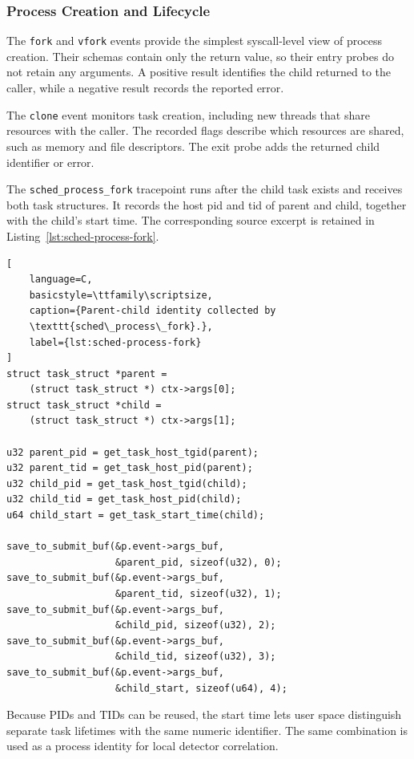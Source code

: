 \subsubsection{Process Creation and Lifecycle}

The \texttt{fork} and \texttt{vfork} events provide the simplest syscall-level
view of process creation. Their schemas contain only the return value, so their
entry probes do not retain any arguments. A positive result identifies the
child returned to the caller, while a negative result records the reported
error.

The \texttt{clone} event monitors task creation, including new threads
that share resources with the caller. The recorded flags describe
which resources are shared, such as memory and file descriptors. The exit probe adds the returned child identifier
or error.

The \texttt{sched\_process\_fork} tracepoint runs after the child task exists and
receives both task structures. It records the host \gls{pid} and \gls{tid} of
parent and child, together with the child's start time. The corresponding
source excerpt is retained in Listing~\ref{lst:sched-process-fork}.

\begin{lstlisting}[
    language=C,
    basicstyle=\ttfamily\scriptsize,
    caption={Parent-child identity collected by
    \texttt{sched\_process\_fork}.},
    label={lst:sched-process-fork}
]
struct task_struct *parent =
    (struct task_struct *) ctx->args[0];
struct task_struct *child =
    (struct task_struct *) ctx->args[1];

u32 parent_pid = get_task_host_tgid(parent);
u32 parent_tid = get_task_host_pid(parent);
u32 child_pid = get_task_host_tgid(child);
u32 child_tid = get_task_host_pid(child);
u64 child_start = get_task_start_time(child);

save_to_submit_buf(&p.event->args_buf,
                   &parent_pid, sizeof(u32), 0);
save_to_submit_buf(&p.event->args_buf,
                   &parent_tid, sizeof(u32), 1);
save_to_submit_buf(&p.event->args_buf,
                   &child_pid, sizeof(u32), 2);
save_to_submit_buf(&p.event->args_buf,
                   &child_tid, sizeof(u32), 3);
save_to_submit_buf(&p.event->args_buf,
                   &child_start, sizeof(u64), 4);
\end{lstlisting}


Because PIDs and TIDs can be reused, the start time lets user space distinguish
separate task lifetimes with the same numeric identifier. The same combination
is used as a process identity for local detector correlation.

